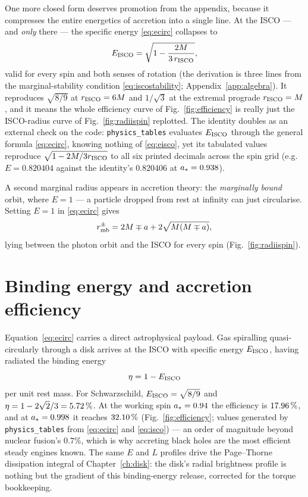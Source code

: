 One more closed form deserves promotion from the appendix, because it
compresses the entire energetics of accretion into a single line. At
the ISCO — and \emph{only} there — the specific energy
\eqref{eq:ecirc} collapses to
\begin{equation}
E_{\rm ISCO} = \sqrt{1 - \frac{2M}{3\,r_{\rm ISCO}}},
\label{eq:eisco}
\end{equation}
valid for every spin and both senses of rotation (the derivation is
three lines from the marginal-stability condition
\eqref{eq:iscostability}; Appendix~\ref{app:algebra}). It reproduces
$\sqrt{8/9}$ at $r_{\rm ISCO} = 6M$ and $1/\sqrt{3}$ at the extremal
prograde $r_{\rm ISCO} = M$, and it means the whole efficiency curve of
Fig.~\ref{fig:efficiency} is really just the ISCO-radius curve of
Fig.~\ref{fig:radiispin} replotted. The identity doubles as an external
check on the code: \texttt{physics\_tables} evaluates $E_{\rm ISCO}$
through the general formula \eqref{eq:ecirc}, knowing nothing of
\eqref{eq:eisco}, yet its tabulated values reproduce
$\sqrt{1-2M/3r_{\rm ISCO}}$ to all six printed decimals across the
spin grid (e.g.\ $E = 0.820404$ against the identity's $0.820406$ at
$a_* = 0.938$).

A second marginal radius appears in accretion theory: the
\emph{marginally bound} orbit, where $E = 1$ — a particle dropped from
rest at infinity can just circularise. Setting $E = 1$ in
\eqref{eq:ecirc} gives
\begin{equation}
r_{\rm mb}^{\pm} = 2M \mp a + 2\sqrt{M(M \mp a)},
\label{eq:rmb}
\end{equation}
lying between the photon orbit and the ISCO for every spin
(Fig.~\ref{fig:radiispin}).

\section{Binding energy and accretion efficiency}
\label{sec:efficiency}

Equation~\eqref{eq:ecirc} carries a direct astrophysical payload. Gas
spiralling quasi-circularly through a disk arrives at the ISCO with
specific energy $E_{\rm ISCO}$, having radiated the binding energy
\begin{equation}
\eta = 1 - E_{\rm ISCO}
\label{eq:eta}
\end{equation}
per unit rest mass. For Schwarzschild,
$E_{\rm ISCO} = \sqrt{8/9}$ and $\eta = 1 - 2\sqrt{2}/3 =
5.72\,\%$. At the \sgra{} working spin $a_* = 0.94$ the
efficiency is $17.96\,\%$, and at $a_* = 0.998$ it reaches
$32.10\,\%$ (Fig.~\ref{fig:efficiency}; values generated by
\texttt{physics\_tables} from \eqref{eq:ecirc} and \eqref{eq:isco}) —
an order of magnitude beyond nuclear fusion's $0.7\%$, which is why
accreting black holes are the most efficient steady engines known. The
same $E$ and $L$ profiles drive the Page--Thorne dissipation integral of
Chapter~\ref{ch:disk}: the disk's radial brightness profile is nothing
but the gradient of this binding-energy release, corrected for the
torque bookkeeping.

